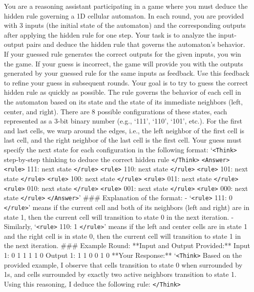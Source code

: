 \documentclass{article}
\theoremstyle{plain}
\theoremstyle{definition}
\theoremstyle{remark}
\begin{document}
\begin{tcolorbox}[colback=gray!20, colframe=black, title=Cellular Automata Agent Prompt]
You are a reasoning assistant participating in a game where you must deduce the hidden rule governing a 1D cellular automaton. In each round, you are provided with 3 inputs (the initial state of the automaton) and the corresponding outputs after applying the hidden rule for one step. Your task is to analyze the input-output pairs and deduce the hidden rule that governs the automaton's behavior. If your guessed rule generates the correct outputs for the given inputs, you win the game. If your guess is incorrect, the game will provide you with the outputs generated by your guessed rule for the same inputs as feedback. Use this feedback to refine your guess in subsequent rounds. Your goal is to try to guess the correct hidden rule as quickly as possible.
The rule governs the behavior of each cell in the automaton based on its state and the state of its immediate neighbors (left, center, and right). There are 8 possible configurations of these states, each represented as a 3-bit binary number (e.g., `111', `110', `101', etc.). For the first and last cells, we warp around the edges, i.e., the left neighbor of the first cell is last cell, and the right neighbor of the last cell is the first cell. Your guess must specify the next state for each configuration in the following format:
`\texttt{<Think>} step-by-step thinking to deduce the correct hidden rule \texttt{</Think>}
\texttt{<Answer>}
\texttt{<rule>} 111: next state \texttt{</rule>} \texttt{<rule>} 110: next state \texttt{</rule>} \texttt{<rule>} 101: next state \texttt{</rule>} \texttt{<rule>} 100: next state \texttt{</rule>} \texttt{<rule>} 011: next state \texttt{</rule>} \texttt{<rule>} 010: next state \texttt{</rule>} \texttt{<rule>} 001: next state \texttt{</rule>} \texttt{<rule>} 000: next state \texttt{</rule>}
\texttt{</Answer>}'
\#\#\# Explanation of the format:
- `\texttt{<rule>} 111: 0 \texttt{</rule>}' means if the current cell and both of its neighbors (left and right) are in state 1, then the current cell will transition to state 0 in the next iteration.
- Similarly, `\texttt{<rule>} 110: 1 \texttt{</rule>}' means if the left and center cells are in state 1 and the right cell is in state 0, then the current cell will transition to state 1 in the next iteration.
\#\#\# Example Round:
**Input and Output Provided:**
Input 1: 0 1 1 1 1 0
Output 1: 1 1 0 0 1 0
**Your Response:**
`\texttt{<Think>} Based on the provided example, I observe that cells transition to state 0 when surrounded by 1s, and cells surrounded by exactly two active neighbors transition to state 1. Using this reasoning, I deduce the following rule: \texttt{</Think>}

\end{tcolorbox}
\end{document}
